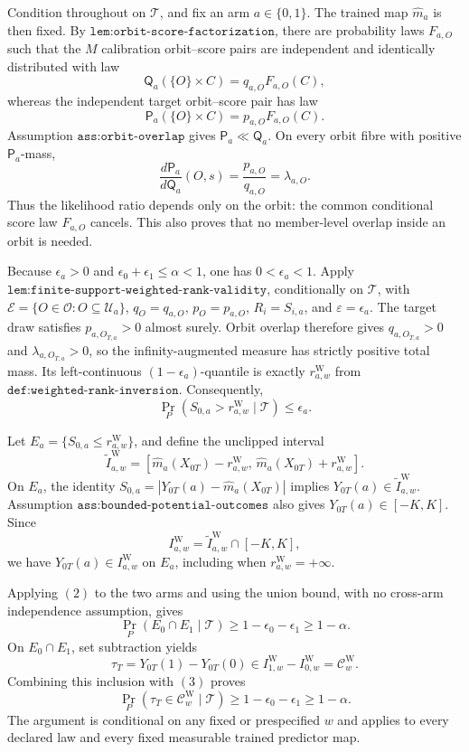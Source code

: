 Condition throughout on \(\mathcal T\), and fix an arm \(a\in\{0,1\}\). The trained map \(\widehat m_a\) is then fixed. By \(\texttt{lem:orbit-score-factorization}\), there are probability laws \(F_{a,O}\) such that the \(M\) calibration orbit--score pairs are independent and identically distributed with law
\[
\mathsf Q_a(\{O\}\times C)=q_{a,O}F_{a,O}(C),
\]
whereas the independent target orbit--score pair has law
\[
\mathsf P_a(\{O\}\times C)=p_{a,O}F_{a,O}(C).
\]
Assumption \(\texttt{ass:orbit-overlap}\) gives \(\mathsf P_a\ll\mathsf Q_a\). On every orbit fibre with positive \(\mathsf P_a\)-mass,
\[
\frac{d\mathsf P_a}{d\mathsf Q_a}(O,s)=\frac{p_{a,O}}{q_{a,O}}=\lambda_{a,O}.
\tag{1}
\]
Thus the likelihood ratio depends only on the orbit: the common conditional score law \(F_{a,O}\) cancels. This also proves that no member-level overlap inside an orbit is needed.

Because \(\epsilon_a>0\) and \(\epsilon_0+\epsilon_1\le\alpha<1\), one has \(0<\epsilon_a<1\). Apply \(\texttt{lem:finite-support-weighted-rank-validity}\), conditionally on \(\mathcal T\), with \(\mathscr E=\{O\in\mathcal O:O\subseteq\mathcal U_a\}\), \(q_O=q_{a,O}\), \(p_O=p_{a,O}\), \(R_i=S_{i,a}\), and \(\varepsilon=\epsilon_a\). The target draw satisfies \(p_{a,O_{T,a}}>0\) almost surely. Orbit overlap therefore gives \(q_{a,O_{T,a}}>0\) and \(\lambda_{a,O_{T,a}}>0\), so the infinity-augmented measure has strictly positive total mass. Its left-continuous \((1-\epsilon_a)\)-quantile is exactly \(r^{\mathrm W}_{a,w}\) from \(\texttt{def:weighted-rank-inversion}\). Consequently,
\[
\Pr_P\!\left(S_{0,a}>r^{\mathrm W}_{a,w}\mid\mathcal T\right)\le\epsilon_a.
\tag{2}
\]

Let \(E_a=\{S_{0,a}\le r^{\mathrm W}_{a,w}\}\), and define the unclipped interval
\[
\widetilde I^{\mathrm W}_{a,w}=\left[\widehat m_a(X_{0T})-r^{\mathrm W}_{a,w},\,\widehat m_a(X_{0T})+r^{\mathrm W}_{a,w}\right].
\]
On \(E_a\), the identity \(S_{0,a}=|Y_{0T}(a)-\widehat m_a(X_{0T})|\) implies \(Y_{0T}(a)\in\widetilde I^{\mathrm W}_{a,w}\). Assumption \(\texttt{ass:bounded-potential-outcomes}\) also gives \(Y_{0T}(a)\in[-K,K]\). Since
\[
I^{\mathrm W}_{a,w}=\widetilde I^{\mathrm W}_{a,w}\cap[-K,K],
\]
we have \(Y_{0T}(a)\in I^{\mathrm W}_{a,w}\) on \(E_a\), including when \(r^{\mathrm W}_{a,w}=+\infty\).

Applying \((2)\) to the two arms and using the union bound, with no cross-arm independence assumption, gives
\[
\Pr_P(E_0\cap E_1\mid\mathcal T)\ge 1-\epsilon_0-\epsilon_1\ge1-\alpha.
\tag{3}
\]
On \(E_0\cap E_1\), set subtraction yields
\[
\tau_T=Y_{0T}(1)-Y_{0T}(0)\in I^{\mathrm W}_{1,w}-I^{\mathrm W}_{0,w}=\mathcal C^{\mathrm W}_w.
\]
Combining this inclusion with \((3)\) proves
\[
\Pr_P(\tau_T\in\mathcal C^{\mathrm W}_w\mid\mathcal T)\ge1-\epsilon_0-\epsilon_1\ge1-\alpha.
\]
The argument is conditional on any fixed or prespecified \(w\) and applies to every declared law and every fixed measurable trained predictor map.

